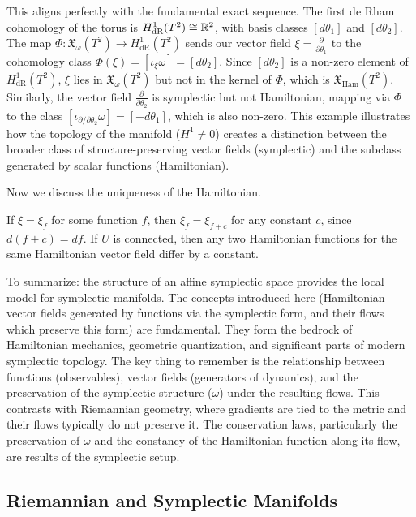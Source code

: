 \begin{example}
This aligns perfectly with the fundamental exact sequence. The first de Rham cohomology of the torus is $H^1_{\text{dR}}(T^2) \cong \mathbb{R}^2$, with basis classes $[d\theta_1]$ and $[d\theta_2]$. The map $\Phi: \mathfrak{X}_{\omega}(T^2) \to H^1_{\text{dR}}(T^2)$ sends our vector field $\xi = \frac{\partial}{\partial\theta_1}$ to the cohomology class $\Phi(\xi) = [\iota_\xi \omega] = [d\theta_2]$. Since $[d\theta_2]$ is a non-zero element of $H^1_{\text{dR}}(T^2)$, $\xi$ lies in $\mathfrak{X}_{\omega}(T^2)$ but not in the kernel of $\Phi$, which is $\mathfrak{X}_{\mathrm{Ham}}(T^2)$. Similarly, the vector field $\frac{\partial}{\partial\theta_2}$ is symplectic but not Hamiltonian, mapping via $\Phi$ to the class $[\iota_{\partial/\partial\theta_2}\omega] = [-d\theta_1]$, which is also non-zero. This example illustrates how the topology of the manifold ($H^1 \neq 0$) creates a distinction between the broader class of structure-preserving vector fields (symplectic) and the subclass generated by scalar functions (Hamiltonian).
\end{example}

Now we discuss the uniqueness of the Hamiltonian.

\begin{remark}
If $\xi = \xi_f$ for some function $f$, then $\xi_f = \xi_{f+c}$ for any constant $c$, since $d(f+c) = d f$. If $U$ is connected, then any two Hamiltonian functions for the same Hamiltonian vector field differ by a constant.
\end{remark}

To summarize: the structure of an affine symplectic space provides the local model for symplectic manifolds. The concepts introduced here (Hamiltonian vector fields generated by functions via the symplectic form, and their flows which preserve this form) are fundamental. They form the bedrock of Hamiltonian mechanics, geometric quantization, and significant parts of modern symplectic topology. The key thing to remember is the relationship between functions (observables), vector fields (generators of dynamics), and the preservation of the symplectic structure ($\omega$) under the resulting flows. This contrasts with Riemannian geometry, where gradients are tied to the metric and their flows typically do not preserve it. The conservation laws, particularly the preservation of $\omega$ and the constancy of the Hamiltonian function along its flow, are results of the symplectic setup.

\subsection{Riemannian and Symplectic Manifolds}

